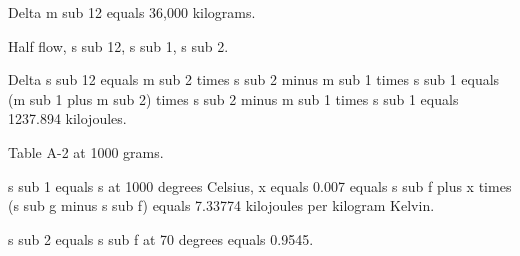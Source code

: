Delta m sub 12 equals 36,000 kilograms.

Half flow, s sub 12, s sub 1, s sub 2.

Delta s sub 12 equals m sub 2 times s sub 2 minus m sub 1 times s sub 1 equals (m sub 1 plus m sub 2) times s sub 2 minus m sub 1 times s sub 1 equals 1237.894 kilojoules.

Table A-2 at 1000 grams.

s sub 1 equals s at 1000 degrees Celsius, x equals 0.007 equals s sub f plus x times (s sub g minus s sub f) equals 7.33774 kilojoules per kilogram Kelvin.

s sub 2 equals s sub f at 70 degrees equals 0.9545.